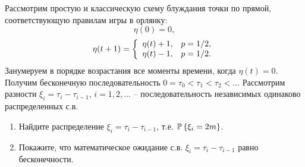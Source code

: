 \begin{problem}\label{bluzd_ust}
Рассмотрим простую и классическую схему блуждания точки по прямой, соответствующую правилам игры в орлянку:
\[\eta (0)=0,\] 
\[\eta (t+1)=\left\{\begin{array}{cc} {\eta (t)+1,} & {p={1\mathord{\left/ {\vphantom {1 2}} \right. \kern-\nulldelimiterspace} 2} }, \\ {\eta (t)-1,} & {p={1\mathord{\left/ {\vphantom {1 2}} \right. \kern-\nulldelimiterspace} 2} }. \end{array}\right. \] 
Занумеруем в порядке возрастания все моменты времени, когда $\eta (t)=0$. Получим бесконечную последовательность $0=\tau _{0} <\tau _{1} <\tau _{2} <...$ Рассмотрим разности $\xi _{i} =\tau _{i} -\tau _{i-1} $, $i=1,2,...$ -- последовательность независимых одинаково распределенных с.в.
\begin{enumerate}
\item Найдите распределение $\xi _{i} =\tau _{i} -\tau _{i-1} $, т.е. $\mathrm{{\mathbb P}}\left\{\xi _{i} =2m\right\}$.
\item Покажите, что математическое ожидание с.в. $\xi _{i} =\tau _{i} -\tau _{i-1} $ равно бесконечности.
\end{enumerate}
\end{problem}
